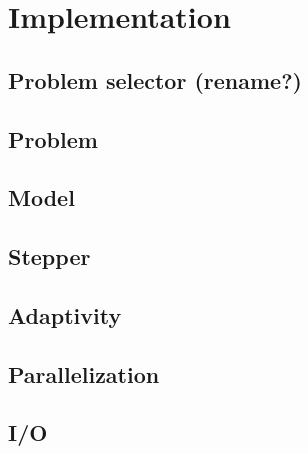 \documentclass{ansarticle}
\begin{document}
\section{Implementation}
\subsection{Problem selector (rename?)}

\subsection{Problem}
\subsection{Model}
\subsection{Stepper}

\subsection{Adaptivity}
\subsection{Parallelization}
\subsection{I/O}





\end{document}
